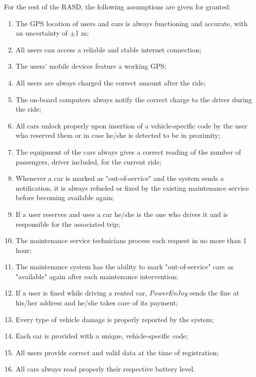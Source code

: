 For the rest of the RASD, the following assumptions are given for granted:

\begin{enumerate}
\item The GPS location of users and cars is always functioning and accurate, with an uncertainty of $\pm$1 m; 
\item All users can access a reliable and stable internet connection;
\item The users' mobile devices feature a working GPS;
\item All users are always charged the correct amount after the ride;
\item The on-board computers always notify the correct charge to the driver during the ride;
\item All cars unlock properly upon insertion of a vehicle-specific code by the user who reserved them or in case he/she is detected to be in proximity;
\item The equipment of the cars always gives a correct reading of the number of passengers, driver included, for the current ride;
\item Whenever a car is marked as "out-of-service" and the system sends a notification, it is always refueled or fixed by the existing maintenance service before becoming available again;
\item If a user reserves and uses a car he/she is the one who drives it and is responsible for the associated trip;
\item The maintenance service technicians process each request in no more than 1 hour;
\item The maintenance system has the ability to mark "out-of-service" cars as "available" again after each maintenance intervention;
\item If a user is fined while driving a rented car, \emph{PowerEnJoy} sends the fine at his/her address and he/she takes care of its payment;
\item Every type of vehicle damage is properly reported by the system;
\item Each car is provided with a unique, vehicle-specific code;
\item All users provide correct and valid data at the time of registration;
\item All cars always read properly their respective battery level.
\end{enumerate}